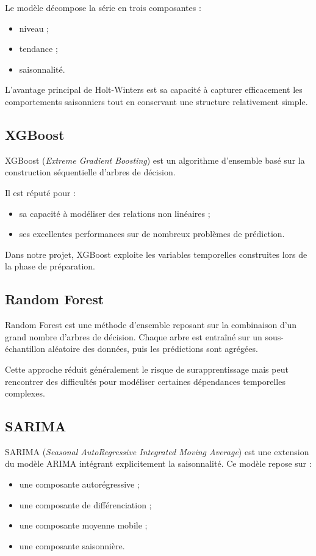 \documentclass[12pt,a4paper,twoside]{report}
\begin{document}
Le modèle décompose la série en trois composantes :
\begin{itemize}
    \item niveau ;
    \item tendance ;
    \item saisonnalité.
\end{itemize}

L'avantage principal de Holt-Winters est sa capacité à capturer efficacement les comportements saisonniers tout en conservant une structure relativement simple.

\subsection{XGBoost}

XGBoost (\textit{Extreme Gradient Boosting}) est un algorithme d'ensemble basé sur la construction séquentielle d'arbres de décision.

Il est réputé pour :
\begin{itemize}
    \item sa capacité à modéliser des relations non linéaires ;
    \item ses excellentes performances sur de nombreux problèmes de prédiction.
\end{itemize}

Dans notre projet, XGBoost exploite les variables temporelles construites lors de la phase de préparation.

\subsection{Random Forest}

Random Forest est une méthode d'ensemble reposant sur la combinaison d'un grand nombre d'arbres de décision. Chaque arbre est entraîné sur un sous-échantillon aléatoire des données, puis les prédictions sont agrégées.

Cette approche réduit généralement le risque de surapprentissage mais peut rencontrer des difficultés pour modéliser certaines dépendances temporelles complexes.

\subsection{SARIMA}

SARIMA (\textit{Seasonal AutoRegressive Integrated Moving Average}) est une extension du modèle ARIMA intégrant explicitement la saisonnalité. Ce modèle repose sur :
\begin{itemize}
    \item une composante autorégressive ;
    \item une composante de différenciation ;
    \item une composante moyenne mobile ;
    \item une composante saisonnière.
\end{itemize}
\end{document}
